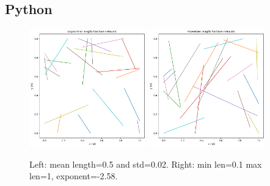 \documentclass{article}
\begin{document}
\FloatBarrier  %
\subsection{Python}
\begin{figure}[htbp!]
    \centering
    \includegraphics[width=0.45\textwidth]{images/LognormalFrac.png}
    \hspace{0.05\textwidth}
    \includegraphics[width=0.45\textwidth]{images/PowerlawFrac.png}
    \caption{Left: mean length=0.5 and std=0.02. Right: min len=0.1 max len=1, exponent=-2.58.}
    \label{fig:LengthDistPy}
\end{figure}
\end{document}
